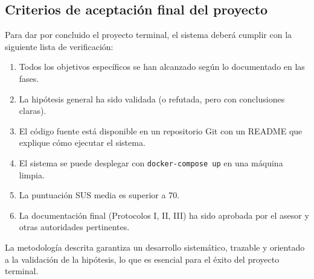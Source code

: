 \subsection{Criterios de aceptación final del proyecto}

Para dar por concluido el proyecto terminal, el sistema deberá cumplir con la siguiente lista de verificación:

\begin{enumerate}
    \item Todos los objetivos específicos se han alcanzado según lo documentado en las fases.
    \item La hipótesis general ha sido validada (o refutada, pero con conclusiones claras).
    \item El código fuente está disponible en un repositorio Git con un README que explique cómo ejecutar el sistema.
    \item El sistema se puede desplegar con \texttt{docker-compose up} en una máquina limpia.
    \item La puntuación SUS media es superior a 70.
    \item La documentación final (Protocolos I, II, III) ha sido aprobada por el asesor y otras autoridades pertinentes.
\end{enumerate}

La metodología descrita garantiza un desarrollo sistemático, trazable y orientado a la validación de la hipótesis, lo que es esencial para el éxito del proyecto terminal.
